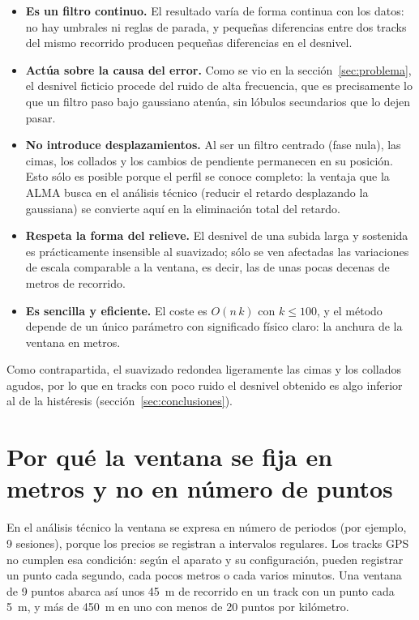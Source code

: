 \documentclass[11pt,a4paper]{article}
\begin{document}
\begin{itemize}
    \item \textbf{Es un filtro continuo.} El resultado varía de forma continua
          con los datos: no hay umbrales ni reglas de parada, y pequeñas
          diferencias entre dos tracks del mismo recorrido producen pequeñas
          diferencias en el desnivel.
    \item \textbf{Actúa sobre la causa del error.} Como se vio en la
          sección~\ref{sec:problema}, el desnivel ficticio procede del ruido de alta frecuencia,
          que es precisamente lo que un filtro paso bajo gaussiano atenúa, sin
          lóbulos secundarios que lo dejen pasar.
    \item \textbf{No introduce desplazamientos.} Al ser un filtro centrado
          (fase nula), las cimas, los collados y los cambios de pendiente
          permanecen en su posición. Esto sólo es posible porque el perfil se
          conoce completo: la ventaja que la ALMA busca en el análisis técnico
          (reducir el retardo desplazando la gaussiana) se convierte aquí en la
          eliminación total del retardo.
    \item \textbf{Respeta la forma del relieve.} El desnivel de una subida
          larga y sostenida es prácticamente insensible al suavizado; sólo se
          ven afectadas las variaciones de escala comparable a la ventana, es
          decir, las de unas pocas decenas de metros de recorrido.
    \item \textbf{Es sencilla y eficiente.} El coste es $O(n\,k)$ con
          $k \leq 100$, y el método depende de un único parámetro con
          significado físico claro: la anchura de la ventana en metros.
\end{itemize}

Como contrapartida, el suavizado redondea ligeramente las cimas y los collados
agudos, por lo que en tracks con poco ruido el desnivel obtenido es algo
inferior al de la histéresis (sección~\ref{sec:conclusiones}).

\section{Por qué la ventana se fija en metros y no en número de puntos}

En el análisis técnico la ventana se expresa en número de periodos (por
ejemplo, 9 sesiones), porque los precios se registran a intervalos regulares.
Los tracks GPS no cumplen esa condición: según el aparato y su configuración,
pueden registrar un punto cada segundo, cada pocos metros o cada varios
minutos. Una ventana de 9 puntos abarca así unos 45~m de recorrido en un track
con un punto cada 5~m, y más de 450~m en uno con menos de 20 puntos por
kilómetro.
\end{document}
